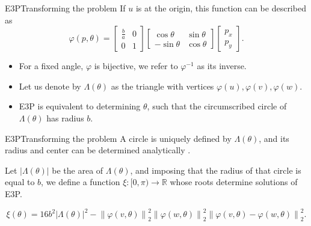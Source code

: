 \documentclass{beamer}
\newcommand{\R}{\mathbb{R}}
\newcommand{\norm}[2][2]{\left\lVert#2\right\rVert_{#1}}
\theoremstyle{definition}
\begin{document}
\begin{frame}{E3P}{Transforming the problem}
	If $u$ is at the origin, this function can be described as
	\begin{equation*}%
	\varphi(p, \theta)=\left[\begin{array}{cc}
	\frac{b}{a}&0\\
	0&1
	\end{array}\right]
	\left[\begin{array}{cc}
	\cos{\theta}&\sin{\theta}\\
	-\sin{\theta}&\cos{\theta}
	\end{array}\right]\left[\begin{array}{c}
	p_x\\
	p_y
	\end{array}\right].
	\end{equation*}
	
	\begin{itemize}
		\item For a fixed angle, $\varphi$ is bijective, we refer to $\varphi^{-1}$ as its inverse.
		\item Let us denote by $\Lambda(\theta)$ as the triangle with vertices $\varphi(u), \varphi(v), \varphi(w)$.
		\item E3P is equivalent to determining $\theta$, such that the circumscribed circle of $\Lambda(\theta)$ has radius $b$.
	\end{itemize}	
\end{frame}

\begin{frame}{E3P}{Transforming the problem}
	A circle is uniquely defined by $\Lambda(\theta)$, and its radius and center can be determined analytically \cite{weisstein}. 
	
	Let $|\Lambda(\theta)|$ be the area of $\Lambda(\theta)$, and imposing that the radius of that circle is equal to $b$, we define a function $\xi \colon [0, \pi) \to \R$ whose roots determine solutions of E3P. 
	
	\begin{equation*}\label{eq:xi}
	\xi(\theta) = 16b^2|\Lambda(\theta)|^2 - \norm{\varphi(v, \theta)}^2\norm{\varphi(w, \theta)}^2\norm{\varphi(v, \theta)-\varphi(w, \theta)}^2.
	\end{equation*}
\end{frame}
\end{document}
